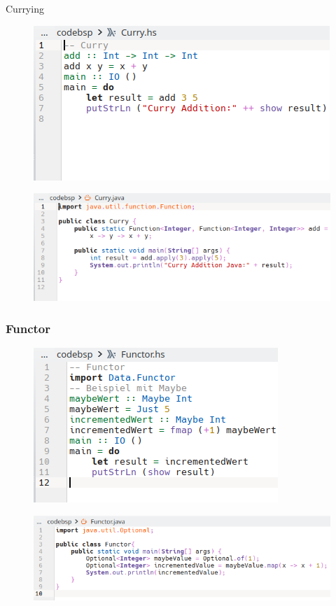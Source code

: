 \documentclass{beamer}
\begin{document}
\begin{frame}{Currying}

 \begin{figure}
     \centering
     \includegraphics[scale=0.5]{bilder/FP-Curry-hs.png}
 \end{figure}
 \begin{figure}
     \centering
     \includegraphics[scale=0.5]{bilder/FP-Curry-java.png}
 \end{figure}

\end{frame}

\begin{frame}
\frametitle{Functor}

 \begin{figure}
     \centering
     \includegraphics[scale=0.5]{bilder/FP-Functor-hs.png}
 \end{figure}
 \begin{figure}
     \centering
     \includegraphics[scale=0.5]{bilder/FP-Functor-java.png}
 \end{figure}

\end{frame}
\end{document}
